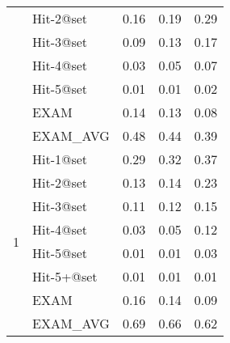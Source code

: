 \begin{table}[b]
{\begin{center}
\begin{tabular}{p{0.5cm}<{\centering}|p{1.5cm}<{\centering}|p{1.5cm}<{\centering}|p{1.5cm}<{\centering}|p{1.2cm}<{\centering}}
									& Hit-2@set     & 0.16 & 0.19 & 0.29 \\
									& Hit-3@set     & 0.09 & 0.13 & 0.17 \\
									& Hit-4@set     & 0.03 & 0.05 & 0.07 \\
									& Hit-5@set     & 0.01 & 0.01 & 0.02 \\
									& EXAM          & 0.14 & 0.13 & 0.08 \\
									& EXAM\_AVG     & 0.48 & 0.44 & 0.39 \\
				\hline
				\multirow{8}{*}{1}  & Hit-1@set     & 0.29 & 0.32 & 0.37 \\
									& Hit-2@set     & 0.13 & 0.14 & 0.23 \\
									& Hit-3@set     & 0.11 & 0.12 & 0.15 \\
									& Hit-4@set     & 0.03 & 0.05 & 0.12 \\
									& Hit-5@set     & 0.01 & 0.01 & 0.03 \\
									& Hit-5+@set    & 0.01 & 0.01 & 0.01 \\
									& EXAM          & 0.16 & 0.14 & 0.09 \\
									& EXAM\_AVG     & 0.69 & 0.66 & 0.62 \\
				\hline
			\end{tabular}
			
			\label{fig:rq2}
		\end{center}
	}
\end{table}